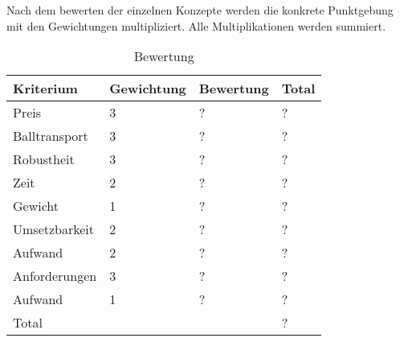 Nach dem bewerten der einzelnen Konzepte werden die konkrete Punktgebung mit den Gewichtungen multipliziert. Alle Multiplikationen werden summiert.

\begin{table}[h!]
	\centering
	\begin{tabular}{l l l l}
		Kriterium & Gewichtung & Bewertung & Total \\
		\hline
		
		Preis & 3 & ? & ? \\
		Balltransport & 3 & ? & ? \\
		Robustheit & 3 & ? & ? \\
		Zeit & 2 & ? & ? \\
		Gewicht & 1 & ? & ? \\
		Umsetzbarkeit & 2 & ? & ? \\
		Aufwand & 2 & ? & ? \\
		Anforderungen & 3 & ? & ? \\
		Aufwand & 1 & ? & ? \\
		Total &  &  & ? \\
	\end{tabular}
	\caption{Bewertung}
	\label{tab:quelle}
\end{table}